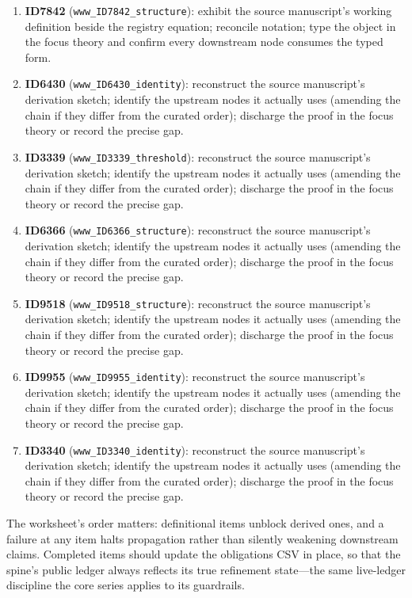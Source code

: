 \documentclass[11pt]{article}
\theoremstyle{remark}
\begin{document}
\begin{enumerate}
\item \textbf{ID7842} (\texttt{www\_ID7842\_structure}): exhibit the source manuscript's working definition beside the registry equation; reconcile notation; type the object in the focus theory and confirm every downstream node consumes the typed form.
\item \textbf{ID6430} (\texttt{www\_ID6430\_identity}): reconstruct the source manuscript's derivation sketch; identify the upstream nodes it actually uses (amending the chain if they differ from the curated order); discharge the proof in the focus theory or record the precise gap.
\item \textbf{ID3339} (\texttt{www\_ID3339\_threshold}): reconstruct the source manuscript's derivation sketch; identify the upstream nodes it actually uses (amending the chain if they differ from the curated order); discharge the proof in the focus theory or record the precise gap.
\item \textbf{ID6366} (\texttt{www\_ID6366\_structure}): reconstruct the source manuscript's derivation sketch; identify the upstream nodes it actually uses (amending the chain if they differ from the curated order); discharge the proof in the focus theory or record the precise gap.
\item \textbf{ID9518} (\texttt{www\_ID9518\_structure}): reconstruct the source manuscript's derivation sketch; identify the upstream nodes it actually uses (amending the chain if they differ from the curated order); discharge the proof in the focus theory or record the precise gap.
\item \textbf{ID9955} (\texttt{www\_ID9955\_identity}): reconstruct the source manuscript's derivation sketch; identify the upstream nodes it actually uses (amending the chain if they differ from the curated order); discharge the proof in the focus theory or record the precise gap.
\item \textbf{ID3340} (\texttt{www\_ID3340\_identity}): reconstruct the source manuscript's derivation sketch; identify the upstream nodes it actually uses (amending the chain if they differ from the curated order); discharge the proof in the focus theory or record the precise gap.
\end{enumerate}

The worksheet's order matters: definitional items unblock derived ones, and a failure at any item halts propagation rather than silently weakening downstream claims. Completed items should update the obligations CSV in place, so that the spine's public ledger always reflects its true refinement state---the same live-ledger discipline the core series applies to its guardrails.
\end{document}

